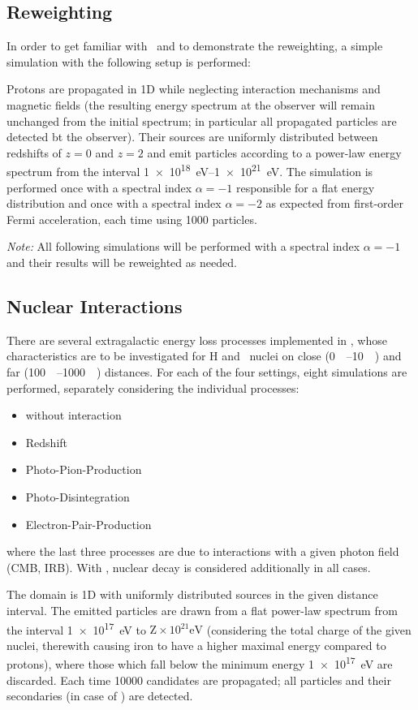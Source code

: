 \subsection{Reweighting}
In order to get familiar with \CRPropa~and to demonstrate the reweighting, a
simple simulation with the following setup is performed:

Protons are propagated in 1D while neglecting interaction mechanisms and
magnetic fields (the resulting energy spectrum at the observer will remain
unchanged from the initial spectrum; in particular all propagated particles
are detected bt the observer). Their sources are uniformly distributed
between redshifts of $z=0$ and $z=2$ and emit particles according to a
power-law energy spectrum from the interval \SIrange{1e18}{1e21}{\eV}. The
simulation is performed once with a spectral index $\alpha=-1$ responsible for
a flat energy distribution and once with a spectral index $\alpha=-2$ as
expected from first-order Fermi acceleration, each time using \num{1000}
particles.

\emph{Note:} All following simulations will be performed with a spectral index
$\alpha=-1$ and their results will be reweighted as needed.


\subsection{Nuclear Interactions}
There are several extragalactic energy loss processes implemented in
\CRPropa, whose characteristics are to be investigated for H and \Fe~nuclei on
close (\SIrange{0}{10}{\mega\parsec}) and far
(\SIrange{100}{1000}{\mega\parsec}) distances. For each of the four settings,
eight simulations are performed, separately considering the individual
processes:
\begin{itemize}
    \item without interaction
    \item Redshift
    \item Photo-Pion-Production
    \item Photo-Disintegration
    \item Electron-Pair-Production
\end{itemize}
where the last three processes are due to interactions with a given photon
field (CMB, IRB). With \Fe, nuclear decay is considered additionally in all
cases.

The domain is 1D with uniformly distributed sources in the given distance
interval.
The emitted particles are drawn from a flat power-law spectrum from the
interval \SI{1e17}{\eV} to $\text{Z}\times10^{21}\si{\eV}$ (considering the
total charge of the given nuclei, therewith causing iron to have a higher
maximal energy compared to protons), where those which fall below the minimum
energy \SI{1e17}{\eV} are discarded. Each time \num{10000} candidates are
propagated; all particles and their secondaries (in case of \Fe) are detected.


